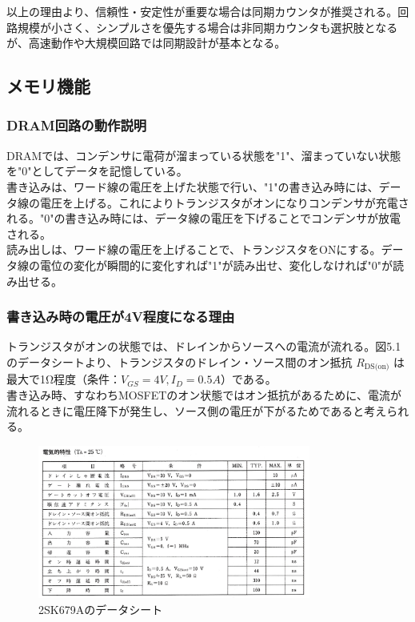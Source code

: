 \documentclass{jlreq}
\numberwithin{equation}{section}
\begin{document}
以上の理由より、信頼性・安定性が重要な場合は同期カウンタが推奨される。回路規模が小さく、シンプルさを優先する場合は非同期カウンタも選択肢となるが、高速動作や大規模回路では同期設計が基本となる。

\subsection{メモリ機能}

\subsubsection{DRAM回路の動作説明}

DRAMでは、コンデンサに電荷が溜まっている状態を"1"、溜まっていない状態を"0"としてデータを記憶している。\\
書き込みは、ワード線の電圧を上げた状態で行い、"1"の書き込み時には、データ線の電圧を上げる。これによりトランジスタがオンになりコンデンサが充電される。"0"の書き込み時には、データ線の電圧を下げることでコンデンサが放電される。\\
読み出しは、ワード線の電圧を上げることで、トランジスタをONにする。データ線の電位の変化が瞬間的に変化すれば"1"が読み出せ、変化しなければ"0"が読み出せる。 \\

\subsubsection{書き込み時の電圧が4V程度になる理由}
トランジスタがオンの状態では、ドレインからソースへの電流が流れる。図5.1のデータシートより、トランジスタのドレイン・ソース間のオン抵抗 $R_{\text{DS(on)}}$ は最大で1Ω程度（条件：$V_{GS}=4V, I_D=0.5A$）である。\\
書き込み時、すなわちMOSFETのオン状態ではオン抵抗があるために、電流が流れるときに電圧降下が発生し、ソース側の電圧が下がるためであると考えられる。

\begin{figure}[H]
  \centering
  \includegraphics[width=0.8\textwidth]{assets/datasheet.png}
  \caption{2SK679Aのデータシート}
\end{figure}
\end{document}
